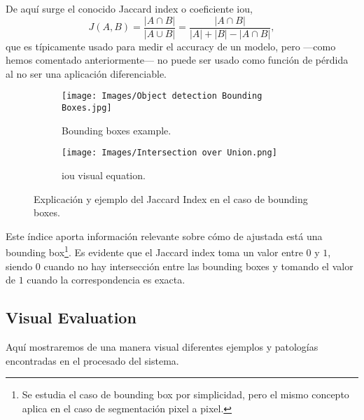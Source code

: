 De aquí surge el conocido Jaccard index o coeficiente \gls{iou},
\begin{equation}
  J(A,B) = \frac{|A \cap B|}{|A \cup B|}
  = \frac{|A \cap B|}{|A| + |B| - |A \cap B|},
\end{equation}
que es típicamente usado para medir el accuracy de un modelo, pero ---como
hemos comentado anteriormente--- no puede ser usado como función de pérdida al
no ser una aplicación diferenciable.

\begin{figure}[ht]
  \begin{subfigure}[t]{.45\textwidth}
    \centering
    \caption{Bounding boxes example.}
    \texttt{[image: Images/Object detection Bounding Boxes.jpg]}
  \end{subfigure}\hfill
  \begin{subfigure}[t]{.45\textwidth}
    \centering
    \caption{\gls{iou} visual equation.}
    \texttt{[image: Images/Intersection over Union.png]}
  \end{subfigure}
  \caption[Explicación del Jaccard Index]{Explicación y ejemplo del Jaccard
    Index en el caso de bounding boxes.}
\end{figure}

Este índice aporta información relevante sobre cómo de ajustada está una
bounding box\footnote{Se estudia el caso de bounding box por simplicidad, pero
  el mismo concepto aplica en el caso de segmentación pixel a pixel.}. Es
evidente que el Jaccard index toma un valor entre \(0\) y \(1\), siendo \(0\)
cuando no hay intersección entre las bounding boxes y tomando el valor de \(1\)
cuando la correspondencia es exacta.

\subsection{Visual Evaluation}

Aquí mostraremos de una manera visual diferentes ejemplos y patologías
encontradas en el procesado del sistema.
